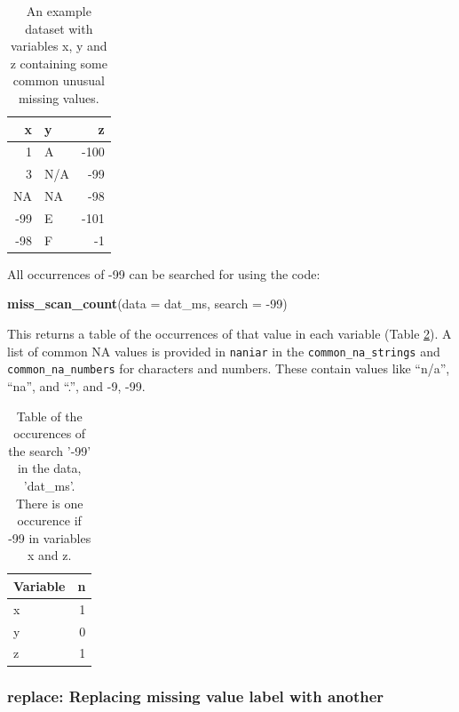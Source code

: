 \documentclass[]{article}
\newenvironment{Shaded}{\begin{snugshade}}{\end{snugshade}}
\newcommand{\DataTypeTok}[1]{\textcolor[rgb]{0.13,0.29,0.53}{#1}}
\newcommand{\DecValTok}[1]{\textcolor[rgb]{0.00,0.00,0.81}{#1}}
\newcommand{\KeywordTok}[1]{\textcolor[rgb]{0.13,0.29,0.53}{\textbf{#1}}}
\newcommand{\NormalTok}[1]{#1}
\theoremstyle{definition}
\theoremstyle{definition}
\theoremstyle{definition}
\theoremstyle{remark}
\begin{document}
\begin{table}[!h]

\caption{\label{tab:setup-miss-scan-count}An example dataset with variables x, y and z containing some common unusual missing values.}
\centering
\begin{tabular}[t]{rlr}
\toprule
x & y & z\\
\midrule
1 & A & -100\\
3 & N/A & -99\\
NA & NA & -98\\
-99 & E & -101\\
-98 & F & -1\\
\bottomrule
\end{tabular}
\end{table}

All occurrences of -99 can be searched for using the code:

\begin{Shaded}
\begin{Highlighting}[]
\KeywordTok{miss_scan_count}\NormalTok{(}\DataTypeTok{data =}\NormalTok{ dat_ms, }\DataTypeTok{search =} \DecValTok{-99}\NormalTok{)}
\end{Highlighting}
\end{Shaded}

This returns a table of the occurrences of that value in each variable
(Table \ref{tab:miss-scan-count}). A list of common NA values is
provided in \texttt{naniar} in the \texttt{common\_na\_strings} and
\texttt{common\_na\_numbers} for characters and numbers. These contain
values like ``n/a'', ``na'', and ``.'', and -9, -99.

\begin{table}[!h]

\caption{\label{tab:miss-scan-count}Table of the occurences of the search '-99' in the data, 'dat\_ms'. There is one occurence if -99 in variables x and z.}
\centering
\begin{tabular}[t]{lr}
\toprule
Variable & n\\
\midrule
x & 1\\
y & 0\\
z & 1\\
\bottomrule
\end{tabular}
\end{table}

\hypertarget{verbs-replace-with}{%
\subsubsection{replace: Replacing missing value label with
another}\label{verbs-replace-with}}
\end{document}
